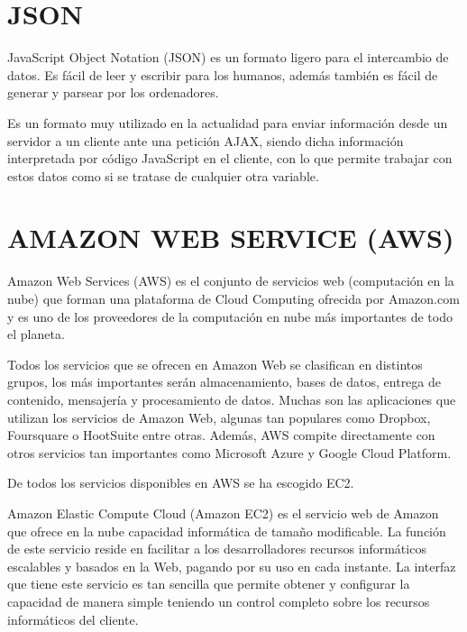 \section{JSON} 
\label{sec:json}


JavaScript Object Notation (JSON) es un formato ligero para el intercambio de datos. Es fácil de leer y escribir para los humanos, además también es fácil de generar y parsear por los ordenadores.


Es un formato muy utilizado en la actualidad para enviar información desde un servidor a un cliente ante una petición AJAX, siendo dicha información interpretada por código JavaScript en el cliente, con lo que permite trabajar con estos datos como si se tratase de cualquier otra variable.



\section{AMAZON WEB SERVICE (AWS)} 
\label{sec:aws}

Amazon Web Services (AWS) es el conjunto de servicios web (computación en la nube) que forman una plataforma de Cloud Computing ofrecida por Amazon.com y es uno de los proveedores de la computación en nube más importantes de todo el planeta.


Todos los servicios que se ofrecen en Amazon Web se clasifican en distintos grupos, los más importantes serán almacenamiento, bases de datos, entrega de contenido, mensajería y procesamiento de datos. Muchas son las aplicaciones que utilizan los servicios de Amazon Web, algunas tan populares como Dropbox, Foursquare o HootSuite entre otras. Además, AWS compite directamente con otros servicios tan importantes como Microsoft Azure y Google Cloud Platform.


De todos los servicios disponibles en AWS se ha escogido EC2.


Amazon Elastic Compute Cloud (Amazon EC2) es el servicio web de Amazon que ofrece en la nube capacidad informática de tamaño modificable. La función de este servicio reside en facilitar a los desarrolladores recursos informáticos escalables y basados en la Web, pagando por su uso en cada instante. La interfaz que tiene este servicio es tan sencilla que permite obtener y configurar la capacidad de manera simple teniendo un control completo sobre los recursos informáticos del cliente.



